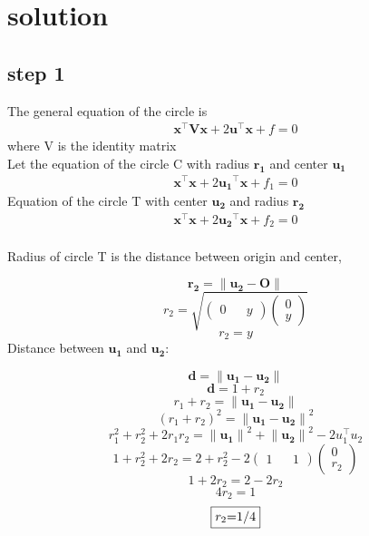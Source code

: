 \documentclass[10pt, a4paper]{article}
\newcommand{\myvec}[1]{\ensuremath{\begin{pmatrix}#1\end{pmatrix}}}
\let\vec\mathbf
\begin{document}
\section*{\large solution}

\subsection*{\large step 1}
The general equation of the circle is
\begin{align}
\vec{x}^{\top}\vec{V}\vec{x}+2\vec{u}^{\top}\vec{x}+f=0
\end{align}
where V is the identity matrix
\\Let the equation of the circle C with radius $\vec{r_1}$ and center $\vec{u_1}$
\begin{align}
\vec{x}^{\top}\vec{x}+2\vec{u_1}^{\top}\vec{x}+f_1=0
\end{align}
Equation of the circle T with center $\vec{u_2}$ and radius $\vec{r_2}$
\begin{align}
\vec{x}^{\top}\vec{x}+2\vec{u_2}^{\top}\vec{x}+f_2=0
\end{align}\\
Radius of circle T is the distance between origin and center,\\
\raggedright \large 
\begin{equation}
\vec{r_2}={\vec{\|u_2-O\|}}
\end{equation}
\begin{equation}
r_2=\sqrt{{\myvec{0 && y} }{\myvec{0 \\ y}}}
\end{equation}
\begin{equation}
\boxed{r_2=y}
\end{equation}
Distance between $\vec{u_1}$ and $\vec{u_2}$:
\raggedright \large 
\begin{equation}
\vec{d}={\vec{\|u_1-u_2\|}}
\end{equation}
\begin{equation}
\vec{d}=1+r_2
\end{equation}
\begin{equation}
r_1+r_2=\vec{\|u_1 -u_2\|} 
\end{equation}
\begin{equation}
(r_1+r_2)^2=\vec{\|u_1 -u_2\|}^2 
\end{equation}
\begin{equation}
r_1^2 + r_2^2 +2 r_1 r_2=\vec{\|u_1 \|}^2 + \vec{\|u_2\|}^2 -2  u_1 ^{\top} u_2 
\end{equation}
\begin{equation}
1+r_2^2 +2 r_2= 2+r_2^2 -2{\myvec{1 && 1} }{\myvec{0 \\ r_2} }
\end{equation}
\begin{equation}
1+2 r_2=2-2 r_2
\end{equation}
\begin{equation}
4 r_2=1
\end{equation}
\begin{equation}
\boxed{$$r_2$=1/4$}
\end{equation}
\vspace{2mm} 
\vspace{5mm}
 \vspace{2mm} 
\end{document}
